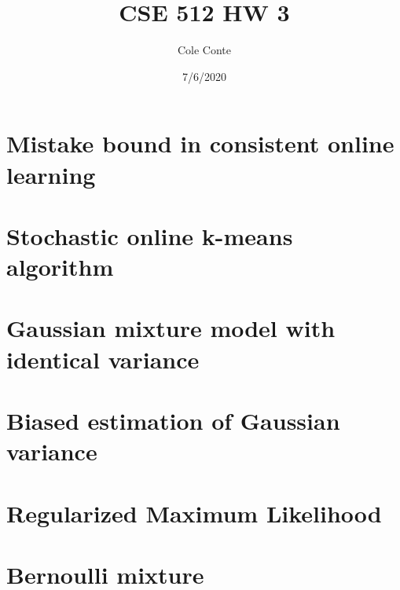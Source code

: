 \documentclass{article}
\begin{document}
\title{CSE 512 HW 3}
\author{Cole Conte}
\date{7/6/2020}

\maketitle

\section{Mistake bound in consistent online learning}

\section{Stochastic online k-means algorithm}

\section{Gaussian mixture model with identical variance}

\section{Biased estimation of Gaussian variance}

\section{Regularized Maximum Likelihood}

\section{Bernoulli mixture}
\end{document}
